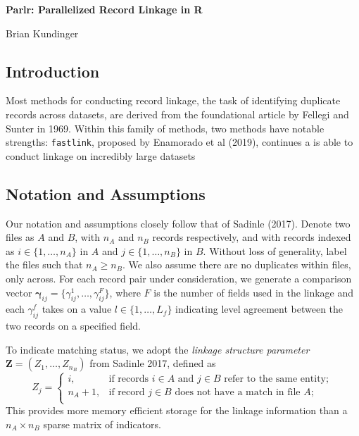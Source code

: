 \documentclass[
  12pt,
]{article}
\author{}
\date{\vspace{-2.5em}}
\begin{document}
\begin{flushright} 
    \end{flushright}
    \begin{center} \textbf{Parlr: Parallelized Record Linkage in R}
    
    Brian Kundinger

    \end{center}

\hypertarget{introduction}{%
\subsection{Introduction}\label{introduction}}

Most methods for conducting record linkage, the task of identifying
duplicate records across datasets, are derived from the foundational
article by Fellegi and Sunter in 1969. Within this family of methods,
two methods have notable strengths: \texttt{fastlink}, proposed by
Enamorado et al (2019), continues a is able to conduct linkage on
incredibly large datasets

\hypertarget{notation-and-assumptions}{%
\subsection{Notation and Assumptions}\label{notation-and-assumptions}}

Our notation and assumptions closely follow that of Sadinle (2017).
Denote two files as \(A\) and \(B\), with \(n_A\) and \(n_B\) records
respectively, and with records indexed as \(i \in \{1, \ldots, n_A\}\)
in \(A\) and \(j \in \{1, \ldots, n_B\}\) in \(B\). Without loss of
generality, label the files such that \(n_A \geq n_B\). We also assume
there are no duplicates within files, only across. For each record pair
under consideration, we generate a comparison vector
\(\boldsymbol{\gamma}_{ij} = \{\gamma_{ij}^1, \ldots, \gamma_{ij}^F\}\),
where \(F\) is the number of fields used in the linkage and each
\(\gamma_{ij}^f\) takes on a value \(l \in \{1, \ldots, L_f\}\)
indicating level agreement between the two records on a specified field.

To indicate matching status, we adopt the \emph{linkage structure
parameter} \(\mathbf{Z} = (Z_1, \ldots, Z_{n_B})\) from Sadinle 2017,
defined as \[Z_j=\begin{cases} 
    i,  & \text{if records } i\in A \text{ and } j\in B \text{ refer to the same entity}; \\
    n_A + 1,  & \text{if record } j\in B \text{ does not have a match in file } A; \\
\end{cases}\] This provides more memory efficient storage for the
linkage information than a \(n_A \times n_B\) sparse matrix of
indicators.
\end{document}
